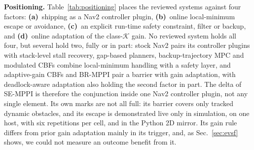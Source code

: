 \documentclass[journal]{IEEEtran}
\begin{document}
\textbf{Positioning.} Table~\ref{tab:positioning} places the reviewed
systems against four factors: \textbf{(a)}~shipping as a Nav2 controller
plugin, \textbf{(b)}~online local-minimum escape or avoidance,
\textbf{(c)}~an explicit run-time safety constraint, filter or backup, and
\textbf{(d)}~online adaptation of the class-$\mathcal{K}$ gain. No
reviewed system holds all four, but several hold two, fully or in part:
stock Nav2 pairs its controller plugins with stack-level stall recovery,
gap-based planners, backup-trajectory MPC and modulated CBFs combine
local-minimum handling with a safety layer, and adaptive-gain CBFs and
BR-MPPI pair a barrier with gain adaptation, with deadlock-aware
adaptation also holding the second factor in part. The delta of SE-MPPI
is therefore the conjunction inside one Nav2 controller plugin, not any
single element. Its own marks are not all full: its barrier covers only
tracked dynamic obstacles, and its escape is demonstrated live only in
simulation, on one host, with six repetitions per cell, and in the Python 2D mirror. Its gain rule differs from prior gain adaptation mainly
in its trigger, and, as Sec.~\ref{sec:evsf} shows, we could not measure
an outcome benefit from it.
\end{document}
